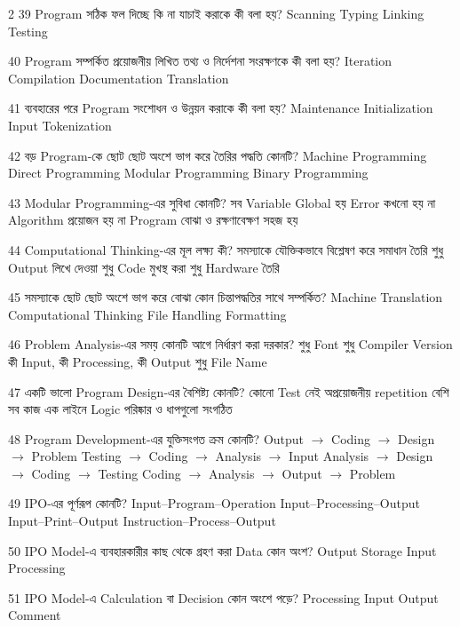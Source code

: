 \begin{multicols}{2}
\mcq
{39}
{Program সঠিক ফল দিচ্ছে কি না যাচাই করাকে কী বলা হয়?}
{Scanning}
{Typing}
{Linking}
{Testing}

\mcq
{40}
{Program সম্পর্কিত প্রয়োজনীয় লিখিত তথ্য ও নির্দেশনা সংরক্ষণকে কী বলা হয়?}
{Iteration}
{Compilation}
{Documentation}
{Translation}

\mcq
{41}
{ব্যবহারের পরে Program সংশোধন ও উন্নয়ন করাকে কী বলা হয়?}
{Maintenance}
{Initialization}
{Input}
{Tokenization}

\mcq
{42}
{বড় Program-কে ছোট ছোট অংশে ভাগ করে তৈরির পদ্ধতি কোনটি?}
{Machine Programming}
{Direct Programming}
{Modular Programming}
{Binary Programming}

\mcqwide
{43}
{Modular Programming-এর সুবিধা কোনটি?}
{সব Variable Global হয়}
{Error কখনো হয় না}
{Algorithm প্রয়োজন হয় না}
{Program বোঝা ও রক্ষণাবেক্ষণ সহজ হয়}

\mcqwide
{44}
{Computational Thinking-এর মূল লক্ষ্য কী?}
{সমস্যাকে যৌক্তিকভাবে বিশ্লেষণ করে সমাধান তৈরি}
{শুধু Output লিখে দেওয়া}
{শুধু Code মুখস্থ করা}
{শুধু Hardware তৈরি}

\mcq
{45}
{সমস্যাকে ছোট ছোট অংশে ভাগ করে বোঝা কোন চিন্তাপদ্ধতির সাথে সম্পর্কিত?}
{Machine Translation}
{Computational Thinking}
{File Handling}
{Formatting}

\mcqwide
{46}
{Problem Analysis-এর সময় কোনটি আগে নির্ধারণ করা দরকার?}
{শুধু Font}
{শুধু Compiler Version}
{কী Input, কী Processing, কী Output}
{শুধু File Name}

\mcqwide
{47}
{একটি ভালো Program Design-এর বৈশিষ্ট্য কোনটি?}
{কোনো Test নেই}
{অপ্রয়োজনীয় repetition বেশি}
{সব কাজ এক লাইনে}
{Logic পরিষ্কার ও ধাপগুলো সংগঠিত}

\mcqwide
{48}
{Program Development-এর যুক্তিসংগত ক্রম কোনটি?}
{Output \(\rightarrow\) Coding \(\rightarrow\) Design \(\rightarrow\) Problem}
{Testing \(\rightarrow\) Coding \(\rightarrow\) Analysis \(\rightarrow\) Input}
{Analysis \(\rightarrow\) Design \(\rightarrow\) Coding \(\rightarrow\) Testing}
{Coding \(\rightarrow\) Analysis \(\rightarrow\) Output \(\rightarrow\) Problem}

\mcqwide
{49}
{IPO-এর পূর্ণরূপ কোনটি?}
{Input–Program–Operation}
{Input–Processing–Output}
{Input–Print–Output}
{Instruction–Process–Output}

\mcq
{50}
{IPO Model-এ ব্যবহারকারীর কাছ থেকে গ্রহণ করা Data কোন অংশ?}
{Output}
{Storage}
{Input}
{Processing}

\mcq
{51}
{IPO Model-এ Calculation বা Decision কোন অংশে পড়ে?}
{Processing}
{Input}
{Output}
{Comment}


\end{multicols}
